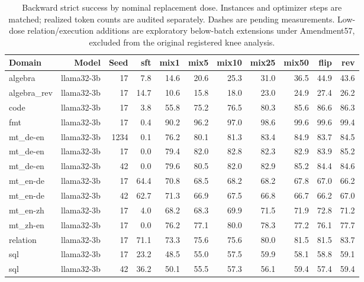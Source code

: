 \begin{table}[t]
\centering
\small
\begin{tabular}{lrrrrrrrrrr}
\toprule
Domain & Model & Seed & sft & mix1 & mix5 & mix10 & mix25 & mix50 & flip & rev \\
\midrule
algebra & llama32-3b & 17 & 7.8 & 14.6 & 20.6 & 25.3 & 31.0 & 36.5 & 44.9 & 43.6 \\
algebra\_rev & llama32-3b & 17 & 14.7 & 10.6 & 15.8 & 18.0 & 23.0 & 24.9 & 27.4 & 26.2 \\
code & llama32-3b & 17 & 3.8 & 55.8 & 75.2 & 76.5 & 80.3 & 85.6 & 86.6 & 86.3 \\
fmt & llama32-3b & 17 & 0.4 & 90.2 & 96.2 & 97.0 & 98.6 & 99.6 & 99.6 & 99.4 \\
mt\_de-en & llama32-3b & 1234 & 0.1 & 76.2 & 80.1 & 81.3 & 83.4 & 84.9 & 83.7 & 84.5 \\
mt\_de-en & llama32-3b & 17 & 0.0 & 79.4 & 82.0 & 82.8 & 82.3 & 82.9 & 83.9 & 85.2 \\
mt\_de-en & llama32-3b & 42 & 0.0 & 79.6 & 80.5 & 82.0 & 82.9 & 85.2 & 84.4 & 84.6 \\
mt\_en-de & llama32-3b & 17 & 64.4 & 70.8 & 68.5 & 68.2 & 68.2 & 67.8 & 67.0 & 66.2 \\
mt\_en-de & llama32-3b & 42 & 62.7 & 71.3 & 66.9 & 67.5 & 66.8 & 66.7 & 66.2 & 67.0 \\
mt\_en-zh & llama32-3b & 17 & 4.0 & 68.2 & 68.3 & 69.9 & 71.5 & 71.9 & 72.8 & 71.2 \\
mt\_zh-en & llama32-3b & 17 & 0.0 & 76.2 & 77.1 & 80.0 & 78.3 & 77.2 & 76.1 & 77.7 \\
relation & llama32-3b & 17 & 71.1 & 73.3 & 75.6 & 75.6 & 80.0 & 81.5 & 81.5 & 83.7 \\
sql & llama32-3b & 17 & 23.2 & 48.5 & 55.0 & 57.5 & 59.9 & 58.1 & 58.8 & 59.1 \\
sql & llama32-3b & 42 & 36.2 & 50.1 & 55.5 & 57.3 & 56.1 & 59.4 & 57.4 & 59.4 \\
\bottomrule
\end{tabular}
\caption{Backward strict success by nominal replacement dose. Instances and optimizer steps are matched; realized token counts are audited separately. Dashes are pending measurements. Low-dose relation/execution additions are exploratory below-batch extensions under Amendment57, excluded from the original registered knee analysis.}
\label{tab:dose}
\end{table}